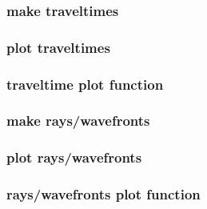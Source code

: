 
\begin{frame} \frametitle{make traveltimes}
\end{frame}
\cwpnote{}

\begin{frame} \frametitle{plot traveltimes}
\end{frame}
\cwpnote{}

\begin{frame} \frametitle{traveltime plot function}
\end{frame}
\cwpnote{}

\begin{frame}
\end{frame}
\cwpnote{}


\begin{frame} \frametitle{make rays/wavefronts}
\end{frame}
\cwpnote{}

\begin{frame} \frametitle{plot rays/wavefronts}
\end{frame}
\cwpnote{}

\begin{frame} \frametitle{rays/wavefronts plot function}
\end{frame}
\cwpnote{}

\begin{frame}
\end{frame}
\cwpnote{}

\begin{frame}


  \vfill


  \vfill

  \begin{center}
  \end{center}

\end{frame}
\cwpnote{}
